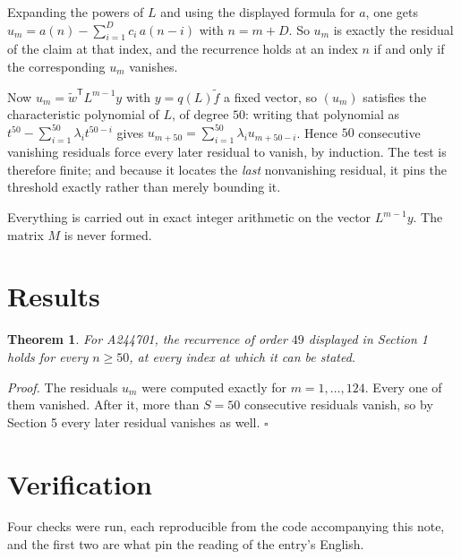 \documentclass[11pt]{article}
\newtheorem{theorem}{Theorem}
\theoremstyle{definition}
\begin{document}
Expanding the powers of $L$ and using the displayed formula for $a$, one gets $u_m = a(n) - \sum_{i=1}^{D} c_i\,a(n-i)$ with $n = m + D$. So $u_m$ is exactly the residual of the claim at that index, and the recurrence holds at an index $n$ if and only if the corresponding $u_m$ vanishes.

Now $u_m = \tilde w^{\mathsf T} L^{m-1} y$ with $y = q(L)\tilde f$ a fixed vector, so $(u_m)$ satisfies the characteristic polynomial of $L$, of degree $50$: writing that polynomial as $t^{50} - \sum_{i=1}^{50} \lambda_i t^{50-i}$ gives $u_{m+50} = \sum_{i=1}^{50} \lambda_i u_{m+50-i}$. Hence $50$ consecutive vanishing residuals force every later residual to vanish, by induction. The test is therefore finite; and because it locates the {\itshape last} nonvanishing residual, it pins the threshold exactly rather than merely bounding it.

Everything is carried out in exact integer arithmetic on the vector $L^{m-1}y$. The matrix $M$ is never formed.

\section{Results}

\begin{theorem} For A244701, the recurrence of order $49$ displayed in Section 1 holds for every $n \ge 50$, at every index at which it can be stated.\end{theorem}

{\itshape Proof.} The residuals $u_m$ were computed exactly for $m = 1,\dots,124$. Every one of them vanished. After it, more than $S = 50$ consecutive residuals vanish, so by Section 5 every later residual vanishes as well. $\square$

\section{Verification}

Four checks were run, each reproducible from the code accompanying this note, and the first two are what pin the reading of the entry's English.
\end{document}
